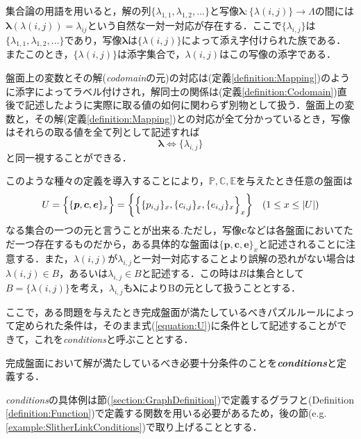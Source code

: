 集合論の用語を用いると，解の列$\{\lambda_{1,1}, \lambda_{1,2},...\}$と写像$\bm{\lambda}\colon \{\lambda(i,j)\} \longrightarrow \Lambda$の間には$\bm{\lambda}(\lambda(i,j))=\lambda_{ij}$という自然な一対一対応が存在する．ここで$\{\lambda_{i,j}\}$は$\{\lambda_{1,1}, \lambda_{1,2},...\}$であり，写像$\bm{\lambda}$は$\{\lambda(i,j)\}$によって添え字付けられた族である．またこのとき，$\{\lambda(i,j)\}$は添字集合で，$\lambda(i,j)$はこの写像の添字である．

盤面上の変数とその解(\textit{codomain}の元)の対応は(定義\ref{definition:Mapping})のように添字によってラベル付けされ，解同士の関係は(定義\ref{definition:Codomain})直後で記述したように実際に取る値の如何に関わらず別物として扱う．盤面上の変数と，その解(定義\ref{definition:Mapping})との対応が全て分かっているとき，写像はそれらの取る値を全て列として記述すれば
\begin{equation*}
  \bm{\lambda}\Leftrightarrow \{\lambda_{i,j}\}
\end{equation*}
と同一視することができる．

このような種々の定義を導入することにより，$\mathbb{P},\mathbb{C},\mathbb{E}$を与えたとき任意の盤面は
\begin{equation*}\label{equation:U}
  U=\Bigl\{\{\bm{p},\bm{c},\bm{e}\}_x\Bigr\}=\biggl\{\Bigl\{\{p_{i,j}\}_x,\{c_{i,j}\}_x,\{e_{i,j}\}_x\Bigr\}_x\biggr\} \quad (1\leq x \leq |U|)
\end{equation*}
なる集合の一つの元と言うことが出来る.ただし，写像$\bm{c}$などは各盤面においてただ一つ存在するものだから，ある具体的な盤面は$\{\bm{p},\bm{c},\bm{e}\}_x$と記述されることに注意する．また，$\lambda(i,j)$が$\lambda_{i,j}$と一対一対応することより誤解の恐れがない場合は$\lambda(i,j) \in B  $，あるいは$\lambda_{i,j}\in B $と記述する．この時は$B$は集合として$B=\{\lambda(i,j)\}$を考え，$\lambda_{i,j}$も$\bm{\lambda}$によりBの元として扱うこととする．

ここで，ある問題を与えたとき完成盤面が満たしているべきパズルルールによって定められた条件は，そのまま式(\ref{equation:U})に条件として記述することができて，これを\textit{conditions}と呼ぶこととする．
\begin{definition}\label{definition:Conditions}
  完成盤面において解が満たしているべき必要十分条件のことを\textbf{\textit{conditions}}と定義する．
\end{definition}
\textit{conditions}の具体例は節(\ref{section:GraphDefinition})で定義するグラフと(Definition \ref{definition:Function})で定義する関数を用いる必要があるため，後の節(e.g. \ref{example:SlitherLinkConditions})で取り上げることとする．

